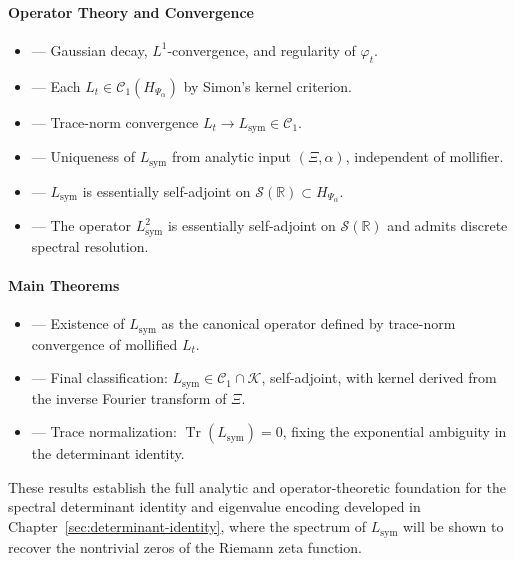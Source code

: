 \paragraph{Operator Theory and Convergence}
\begin{itemize}
  \item {} — Gaussian decay, \( L^1 \)-convergence, and regularity of \( \varphi_t \).
  \item {} — Each \( L_t \in \mathcal{C}_1(H_{\Psi_\alpha}) \) by Simon's kernel criterion.
  \item {} — Trace-norm convergence \( L_t \to L_{\mathrm{sym}} \in \mathcal{C}_1 \).
  \item {} — Uniqueness of \( L_{\mathrm{sym}} \) from analytic input \( (\Xi, \alpha) \), independent of mollifier.
  \item {} — \( L_{\mathrm{sym}} \) is essentially self-adjoint on \( \mathcal{S}(\mathbb{R}) \subset H_{\Psi_\alpha} \).
  \item {} — The operator \( L_{\mathrm{sym}}^2 \) is essentially self-adjoint on \( \mathcal{S}(\mathbb{R}) \) and admits discrete spectral resolution.
\end{itemize}

\paragraph{Main Theorems}
\begin{itemize}
  \item {} — Existence of \( L_{\mathrm{sym}} \) as the canonical operator defined by trace-norm convergence of mollified \( L_t \).
  \item {} — Final classification: \( L_{\mathrm{sym}} \in \mathcal{C}_1 \cap \mathcal{K} \), self-adjoint, with kernel derived from the inverse Fourier transform of \( \Xi \).
  \item {} — Trace normalization: \( \operatorname{Tr}(L_{\mathrm{sym}}) = 0 \), fixing the exponential ambiguity in the determinant identity.
\end{itemize}

\medskip
\noindent
These results establish the full analytic and operator-theoretic foundation for the spectral determinant identity and eigenvalue encoding developed in Chapter~\ref{sec:determinant-identity}, where the spectrum of \( L_{\mathrm{sym}} \) will be shown to recover the nontrivial zeros of the Riemann zeta function.
% 